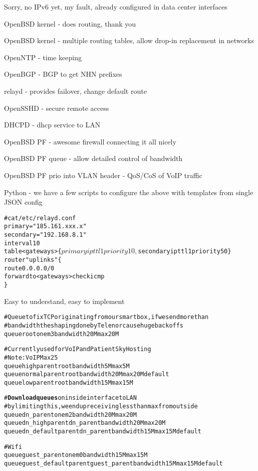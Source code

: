 \documentclass[18pt,landscape,a4paper,footrule]{foils}
\begin{document}
Sorry, no IPv6 yet, my fault, already configured in data center interfaces


\begin{list2}
\item OpenBSD kernel - does routing, thank you
\item OpenBSD kernel - multiple routing tables, allow drop-in replacement in networks
\item OpenNTP - time keeping
\item OpenBGP - BGP to get NHN prefixes
\item relayd - provides failover, change default route
\item OpenSSHD - secure remote access
\item DHCPD - dhcp service to LAN
\item OpenBSD PF - awesome firewall connecting it all nicely
\item OpenBSD PF queue - allow detailed control of bandwidth
\item OpenBSD PF prio into VLAN header - QoS/CoS of VoIP traffic
\item Python - we have a few scripts to configure the above with templates from single JSON config
\end{list2}


\begin{alltt}\footnotesize
# cat /etc/relayd.conf
primary = "185.161.xxx.x"
secondary = "192.168.8.1"
interval 10
table <gateways> \{ $primary ip ttl 1 priority 10, $secondary ip ttl 1 priority 50 \}
router "uplinks" \{
        route 0.0.0.0/0
        forward to <gateways> check icmp
\}
\end{alltt}

Easy to understand, easy to implement


\begin{alltt}\footnotesize
# Queue to fix TCP originating from our smartbox, if we send more than
# bandwidth the shaping done by Telenor cause huge backoffs
queue root on em3 bandwidth 20M max 20M

# Currently used for VoIP and PatientSky Hosting
# Note: VoIP Max 25% of bandwidth, excess dropped by provider!
queue high parent root bandwidth 5M max 5M
queue normal parent root bandwidth 20M max 20M default
queue low parent root bandwidth 15M max 15M

# {\bf Download queues} on inside interface to LAN
# by limiting this, we end up receiving less than max from outside
queue dn_parent on em2 bandwidth 20M max 20M
queue dn_high parent dn_parent bandwidth 20M max 20M
queue dn_default parent dn_parent bandwidth 15M max 15M default

# Wifi
queue guest_parent on em0 bandwidth 15M max 15M
queue guest_default parent guest_parent bandwidth 15M max 15M default
\end{alltt}
\end{document}
